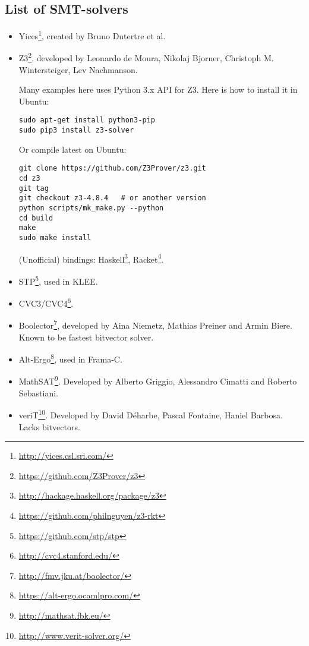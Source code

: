 \subsection{List of SMT-solvers}

\begin{itemize}

\item Yices\footnote{\url{http://yices.csl.sri.com/}}, created by Bruno Dutertre et al.

\item Z3\footnote{\url{https://github.com/Z3Prover/z3}},
developed by Leonardo de Moura, Nikolaj Bjorner, Christoph M. Wintersteiger, Lev Nachmanson.

Many examples here uses Python 3.x API for Z3.
Here is how to install it in Ubuntu:

\begin{lstlisting}
sudo apt-get install python3-pip
sudo pip3 install z3-solver
\end{lstlisting}

Or compile latest on Ubuntu:

\begin{lstlisting}
git clone https://github.com/Z3Prover/z3.git
cd z3
git tag
git checkout z3-4.8.4	# or another version
python scripts/mk_make.py --python
cd build
make
sudo make install
\end{lstlisting}

(Unofficial) bindings:
Haskell\footnote{\url{http://hackage.haskell.org/package/z3}},
Racket\footnote{\url{https://github.com/philnguyen/z3-rkt}}.

\item STP\footnote{\url{https://github.com/stp/stp}}, used in KLEE.

\item CVC3/CVC4\footnote{\url{http://cvc4.stanford.edu/}}.

\item Boolector\footnote{\url{http://fmv.jku.at/boolector/}}, developed by Aina Niemetz, Mathias Preiner and Armin Biere.
Known to be fastest bitvector solver.

\item Alt-Ergo\footnote{\url{https://alt-ergo.ocamlpro.com/}}, used in Frama-C.

\item MathSAT\footnote{\url{http://mathsat.fbk.eu/}}. Developed by Alberto Griggio, Alessandro Cimatti and Roberto Sebastiani.

\item veriT\footnote{\url{http://www.verit-solver.org/}}.
Developed by David Déharbe, Pascal Fontaine, Haniel Barbosa.
Lacks bitvectors.


\end{itemize}
